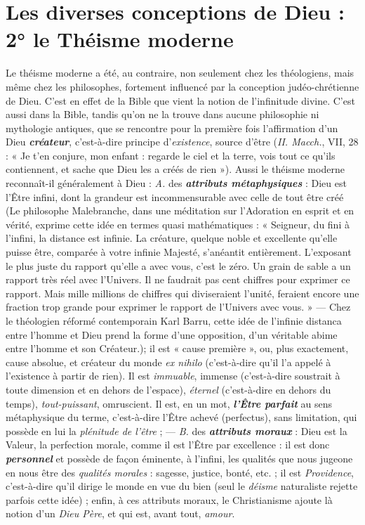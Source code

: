 \section{Les diverses conceptions de Dieu : 2° le Théisme
moderne}%
Le théisme moderne a été, au contraire, non seulement
chez les théologiens, mais même chez les philosophes, fortement
influencé par la {\it }conception judéo-chrétienne de Dieu. C’est en effet
de la Bible que vient la notion de l’\textbf{\textit {}}infinitude divine. C’est aussi
dans la Bible, tandis qu’on ne la trouve dans aucune philosophie ni
mythologie antiques, que se rencontre pour la première fois l’affirmation
d’un Dieu \textbf{\textit {créateur}}, c’est-à-dire principe d’{\it existence}, source
d’être ({\it II. Macch.}, VII, 28 : « Je t’en conjure, mon enfant : regarde
le ciel et la terre, vois tout ce qu’ils contiennent, et sache que Dieu
les a créés de rien »). Aussi le théisme moderne reconnaît-il généralement
à Dieu : {\it A.} des \textbf{\textit {attributs métaphysiques}} : Dieu est l’Être
infini, dont la grandeur est incommensurable avec celle de tout être
créé
{\scriptsize (Le philosophe Malebranche, dans une méditation sur l’Adoration en esprit et en
vérité, exprime cette idée en termes quasi mathématiques : « Seigneur, du fini à l'infini,
la distance est infinie. La créature, quelque noble et excellente qu'elle puisse être, comparée
à votre infinie Majesté, s'anéantit entièrement. L’exposant le plus juste du rapport
qu'elle a avec vous, c’est le zéro. Un grain de sable a un rapport très réel avec l'Univers.
Il ne faudrait pas cent chiffres pour exprimer ce rapport. Mais mille millions de chiffres
qui diviseraient l'unité, feraient encore une fraction trop grande pour exprimer le rapport
de l'Univers avec vous. » — Chez le théologien réformé contemporain Karl Barru,
cette idée de l'infinie distanca entre l’homme et Dieu prend la forme d’une opposition,
d'un véritable abime entre l’homme et son Créateur.)};
il est « cause première », ou, plus exactement, cause absolue,
et créateur du monde {\it ex nihilo} (c’est-à-dire qu’il l’a appelé à l’existence
à partir de rien). Il est {\it immuable}, immense (c’est-à-dire soustrait
à toute dimension et en dehors de l’espace), {\it éternel} (c’est-à-dire
en dehors du temps), {\it tout-puissant}, omruscient. Il est, en un mot,
\textbf{\textit {l'Être parfait}} au sens métaphysique du terme, c’est-à-dire l'Être
achevé (perfectus), sans limitation, qui possède en lui la {\it plénitude
de l'être} ; — {\it B.} des \textbf{\textit {attributs moraux}} : Dieu est {\it }la Valeur, la {\it }perfection
morale, comme il est l’Être par excellence : il est donc \textbf{\textit {personnel}}
et possède de façon éminente, à l’infini, les qualités que nous jugeone
en nous être des {\it qualités morales} : sagesse, justice, bonté, etc. ; il est
{\it Providence}, c’est-à-dire qu’il dirige le monde en vue du bien (seul le
{\it déisme} naturaliste rejette parfois cette idée) ; enfin, à ces attributs
moraux, le Christianisme ajoute là notion d’un {\it Dieu Père}, et qui est,
avant tout, {\it amour}.

